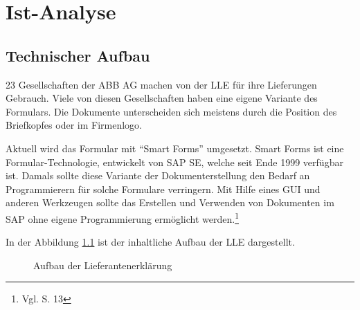 \chapter{Ist-Analyse}
\label{ch:Ist-Analyse}


	
	\section{Technischer Aufbau}
	\label{ch:ist-aufbau}
	23 Gesellschaften der \ac{ABB} AG machen von der \ac{LLE} für ihre Lieferungen Gebrauch. Viele von diesen Gesellschaften haben eine eigene Variante des Formulars. Die Dokumente unterscheiden sich meistens durch die Position des Briefkopfes oder im Firmenlogo. 
	
	Aktuell wird das Formular mit "`Smart Forms"' umgesetzt. Smart Forms ist eine Formular-Technologie, entwickelt von SAP SE, welche seit Ende 1999 verfügbar ist. Damals sollte diese Variante der Dokumenterstellung den Bedarf an Programmierern für solche Formulare verringern. Mit Hilfe eines \ac{GUI} und anderen Werkzeugen sollte das Erstellen und Verwenden von Dokumenten im SAP ohne eigene Programmierung ermöglicht werden.\footnote{Vgl. \cite{Hertleif.2003} S. 13}  
	
	In der Abbildung \ref{AufLLE} ist der inhaltliche Aufbau der \ac{LLE} dargestellt. 
	\begin{figure}[ht]
		\centering
		\caption{Aufbau der Lieferantenerklärung}
		\label{AufLLE}
		
	\end{figure}
	
